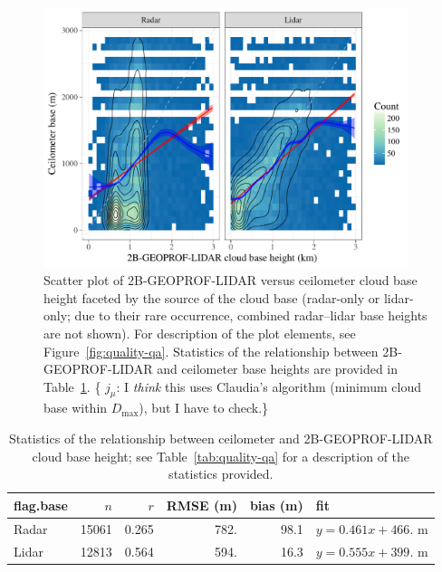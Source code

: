 \documentclass[amt,manuscript]{copernicus}\usepackage[]{graphicx}\usepackage[]{color}
\newcommand{\hlnum}[1]{\textcolor[rgb]{0.686,0.059,0.569}{#1}}%
\newenvironment{knitrout}{}{} %
\newcommand\comment[2]{\{\hlnum{ \textit{#1}: #2}\}}
\newcommand\commentjm[1]{\comment{$j_\mu$}{#1}}
\begin{document}
\begin{figure}
  \centering

\begin{knitrout}
\color{fgcolor}

{\centering \includegraphics[width=0.95\textwidth]{figure/method-eval-2bgeoprof-1} 

}



\end{knitrout}
  \caption{Scatter plot of 2B-GEOPROF-LIDAR versus ceilometer cloud base height
    faceted by the source of the cloud base (radar-only or lidar-only; due to
    their rare occurrence, combined radar--lidar base heights are not shown).
    For description of the plot elements, see Figure~\ref{fig:quality-qa}.  Statistics of the
    relationship between 2B-GEOPROF-LIDAR and ceilometer base heights are provided in
    Table~\ref{tab:2bgeoprof}.
    \commentjm{I \textit{think} this uses Claudia's algorithm (minimum cloud
      base within $D_\text{max}$), but I have to check.}}
  \label{fig:eval-2b}
\end{figure}

\begin{table}
  \caption{Statistics of the relationship between ceilometer and
    2B-GEOPROF-LIDAR cloud base height; see Table~\ref{tab:quality-qa} for a
    description of the statistics provided.}
  \label{tab:2bgeoprof}
  \centering
\begin{tabular}{lrrrrl}
  \hline
\hline
flag.base & $n$ & $r$ & RMSE (m) & bias (m) & fit \\ 
  \hline
Radar & 15061 & 0.265 & 782. & 98.1 & $y = 0.461 x + 466.$ m \\ 
  Lidar & 12813 & 0.564 & 594. & 16.3 & $y = 0.555 x + 399.$ m \\ 
   \hline
\hline
\end{tabular}

\end{table}
\end{document}
